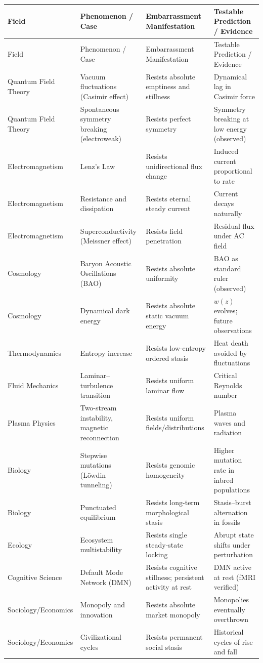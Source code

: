 \documentclass[10pt,a4paper]{article}
\begin{document}
\scriptsize
\begin{longtable}{p{1.7cm}p{3.4cm}p{4.7cm}p{4.7cm}}
\toprule
Field & Phenomenon / Case & Embarrassment Manifestation & Testable Prediction / Evidence \\
\midrule
\endfirsthead
\toprule
Field & Phenomenon / Case & Embarrassment Manifestation & Testable Prediction / Evidence \\
\midrule
\endhead

Quantum Field Theory & Vacuum fluctuations (Casimir effect) & Resists absolute emptiness and stillness & Dynamical lag in Casimir force \\
Quantum Field Theory & Spontaneous symmetry breaking (electroweak) & Resists perfect symmetry & Symmetry breaking at low energy (observed) \\
Electromagnetism & Lenz’s Law & Resists unidirectional flux change & Induced current proportional to rate \\
Electromagnetism & Resistance and dissipation & Resists eternal steady current & Current decays naturally \\
Electromagnetism & Superconductivity (Meissner effect) & Resists field penetration & Residual flux under AC field \\
Cosmology & Baryon Acoustic Oscillations (BAO) & Resists absolute uniformity & BAO as standard ruler (observed) \\
Cosmology & Dynamical dark energy & Resists absolute static vacuum energy & $w(z)$ evolves; future observations \\
Thermodynamics & Entropy increase & Resists low-entropy ordered stasis & Heat death avoided by fluctuations \\
Fluid Mechanics & Laminar–turbulence transition & Resists uniform laminar flow & Critical Reynolds number \\
Plasma Physics & Two-stream instability, magnetic reconnection & Resists uniform fields/distributions & Plasma waves and radiation \\
Biology & Stepwise mutations (Löwdin tunneling) & Resists genomic homogeneity & Higher mutation rate in inbred populations \\
Biology & Punctuated equilibrium & Resists long-term morphological stasis & Stasis–burst alternation in fossils \\
Ecology & Ecosystem multistability & Resists single steady-state locking & Abrupt state shifts under perturbation \\
Cognitive Science & Default Mode Network (DMN) & Resists cognitive stillness; persistent activity at rest & DMN active at rest (fMRI verified) \\
Sociology/Economics & Monopoly and innovation & Resists absolute market monopoly & Monopolies eventually overthrown \\
Sociology/Economics & Civilizational cycles & Resists permanent social stasis & Historical cycles of rise and fall \\
\bottomrule
\end{longtable}
\normalsize
\end{document}
